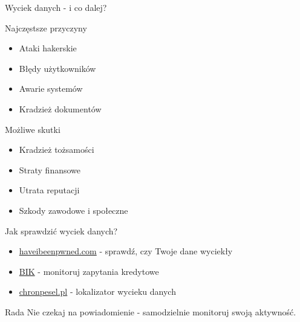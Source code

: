 \begin{frame}{Wyciek danych - i co dalej?}
\begin{alertblock}{Najczęstsze przyczyny}
\begin{itemize}
    \item Ataki hakerskie
    \item Błędy użytkowników
    \item Awarie systemów
    \item Kradzież dokumentów
\end{itemize}
\end{alertblock}
\pause
\begin{exampleblock}{Możliwe skutki}
\begin{itemize}
    \item Kradzież tożsamości
    \item Straty finansowe
    \item Utrata reputacji
    \item Szkody zawodowe i społeczne
\end{itemize}
\end{exampleblock}
\end{frame}

\begin{frame}{Jak sprawdzić wyciek danych?}
\begin{itemize}
    \item \href{https://haveibeenpwned.com}{haveibeenpwned.com} - sprawdź, czy Twoje dane wyciekły
    \item \href{https://www.bik.pl/}{BIK} - monitoruj zapytania kredytowe
    \item \href{https://chronpesel.pl/}{chronpesel.pl} - lokalizator wycieku danych
\end{itemize}
\pause
\begin{alertblock}{Rada}
Nie czekaj na powiadomienie - samodzielnie monitoruj swoją aktywność.
\end{alertblock}
\end{frame}

